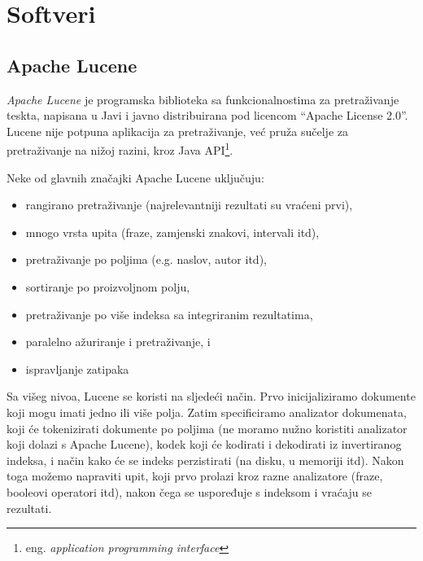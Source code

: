 \documentclass[a4paper,twoside,12pt]{scrreprt}
\begin{document}
\section{Softveri}


\subsection{Apache Lucene}

\textit{Apache Lucene} je programska biblioteka sa funkcionalnostima za pretraživanje teskta, napisana u Javi i javno distribuirana pod licencom ``Apache License 2.0''. Lucene nije potpuna aplikacija za pretraživanje, već pruža sučelje za pretraživanje na nižoj razini, kroz Java API\footnote{eng. \textit{application programming interface}}.

Neke od glavnih značajki Apache Lucene uključuju:

\begin{itemize}
  \item rangirano pretraživanje (najrelevantniji rezultati su vraćeni prvi),
  \item mnogo vrsta upita (fraze, zamjenski znakovi, intervali itd),
  \item pretraživanje po poljima (e.g. naslov, autor itd),
  \item sortiranje po proizvoljnom polju,
  \item pretraživanje po više indeksa sa integriranim rezultatima,
  \item paralelno ažuriranje i pretraživanje, i
  \item ispravljanje zatipaka
\end{itemize}

Sa višeg nivoa, Lucene se koristi na sljedeći način. Prvo inicijaliziramo dokumente koji mogu imati jedno ili više polja. Zatim specificiramo analizator dokumenata, koji će tokenizirati dokumente po poljima (ne moramo nužno koristiti analizator koji dolazi s Apache Lucene), kodek koji će kodirati i dekodirati iz invertiranog indeksa, i način kako će se indeks perzistirati (na disku, u memoriji itd). Nakon toga možemo napraviti upit, koji prvo prolazi kroz razne analizatore (fraze, booleovi operatori itd), nakon čega se uspoređuje s indeksom i vraćaju se rezultati.
\end{document}
